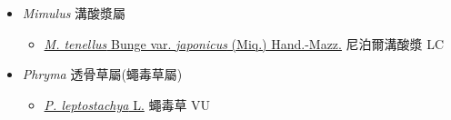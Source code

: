 
  \begin{itemize}
 \item[] \textit{Mimulus} 溝酸漿屬
                    
  \begin{itemize}
        \item[] \href{http://www.theplantlist.org/tpl1.1/search?q=Mimulus+tenellus+var.+japonicus}{\textit{M. tenellus} Bunge var. \textit{japonicus} (Miq.) Hand.-Mazz.}   尼泊爾溝酸漿 LC
  \end{itemize}
 \item[] \textit{Phryma} 透骨草屬(蠅毒草屬)
                    
  \begin{itemize}
        \item[] \href{http://www.theplantlist.org/tpl1.1/search?q=Phryma+leptostachya}{\textit{P. leptostachya} L.}   蠅毒草 VU
  \end{itemize}
  \end{itemize}
